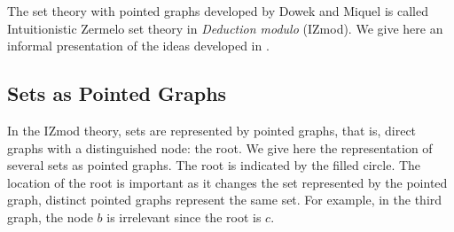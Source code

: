 \documentclass[submission,copyright,creativecommons]{eptcs}
\begin{document}
The set theory with pointed graphs developed by Dowek and Miquel is called Intuitionistic Zermelo set theory in \textit{Deduction modulo} (IZmod). We give here an informal presentation of the ideas developed in \cite{zermodulo}.

\subsection{Sets as Pointed Graphs}

\label{informal}

In the IZmod theory, sets are represented by pointed graphs, that is, direct graphs with a distinguished node: the root. We give here the representation of several sets as pointed graphs. The root is indicated by the filled circle. The location of the root is important as it changes the set represented by the pointed graph, distinct pointed graphs represent the same set. For example, in the third graph, the node $b$ is irrelevant since the root is $c$.
\end{document}
